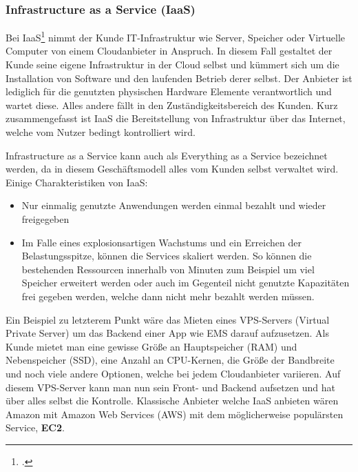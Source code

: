 \subsubsection{Infrastructure as  a Service (IaaS)}
Bei IaaS\footcite{cloud-ms} nimmt der Kunde IT-Infrastruktur wie Server, Speicher oder Virtuelle Computer von einem Cloudanbieter in Anspruch. In diesem Fall gestaltet der Kunde seine eigene Infrastruktur in der Cloud selbst und kümmert sich um die Installation von Software und den laufenden Betrieb derer selbst.
Der Anbieter ist lediglich für die genutzten physischen Hardware Elemente verantwortlich und wartet diese. Alles andere fällt in den Zuständigkeitsbereich des Kunden. Kurz zusammengefasst ist IaaS die Bereitstellung von Infrastruktur über das Internet, welche vom Nutzer bedingt kontrolliert wird.

Infrastructure as a Service kann auch als Everything as a Service bezeichnet werden, da in diesem Geschäftsmodell alles vom Kunden selbst verwaltet wird. Einige Charakteristiken von IaaS:
\begin{itemize}
	\item Nur einmalig genutzte Anwendungen werden einmal bezahlt und wieder freigegeben
	\item Im Falle eines explosionsartigen Wachstums und ein Erreichen der Belastungsspitze, können die Services skaliert werden. So können die bestehenden Ressourcen innerhalb von Minuten zum Beispiel um viel Speicher erweitert werden oder auch im Gegenteil nicht genutzte Kapazitäten frei gegeben werden, welche dann nicht mehr bezahlt werden müssen.
\end{itemize}

Ein Beispiel zu letzterem Punkt wäre das Mieten eines VPS-Servers (Virtual Private Server) um das Backend einer App wie EMS darauf aufzusetzen.
Als Kunde mietet man eine gewisse Größe an Hauptspeicher (RAM) und Nebenspeicher (SSD), eine Anzahl an CPU-Kernen, die Größe der 
Bandbreite und noch viele andere Optionen, welche bei jedem Cloudanbieter variieren. 
Auf diesem VPS-Server kann man nun sein Front- und Backend aufsetzen und hat über alles selbst die Kontrolle.
Klassische Anbieter welche IaaS anbieten wären Amazon mit Amazon Web Services (AWS) mit dem möglicherweise populärsten Service, \textbf{EC2}.

